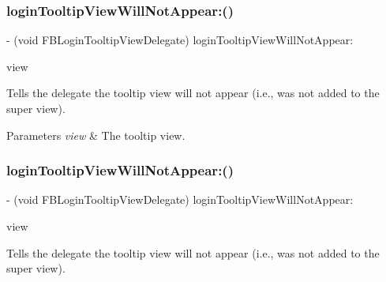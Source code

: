 \subsubsection{\texorpdfstring{login\+Tooltip\+View\+Will\+Not\+Appear\+:()}{loginTooltipViewWillNotAppear:()}\hspace{0.1cm}{\footnotesize\ttfamily [3/5]}}
{\footnotesize\ttfamily -\/ (void F\+B\+Login\+Tooltip\+View\+Delegate) login\+Tooltip\+View\+Will\+Not\+Appear\+: \begin{DoxyParamCaption}\item[{(\hyperlink{interfaceFBLoginTooltipView}{F\+B\+Login\+Tooltip\+View} $\ast$)}]{view }\end{DoxyParamCaption}\hspace{0.3cm}{\ttfamily [optional]}}

Tells the delegate the tooltip view will not appear (i.\+e., was not added to the super view).


\begin{DoxyParams}{Parameters}
{\em view} & The tooltip view. \\
\hline
\end{DoxyParams}
\mbox{\label{protocolFBLoginTooltipViewDelegate_01-p_a90d8a02f0672da781a5b50e517f75685}} 
\subsubsection{\texorpdfstring{login\+Tooltip\+View\+Will\+Not\+Appear\+:()}{loginTooltipViewWillNotAppear:()}\hspace{0.1cm}{\footnotesize\ttfamily [4/5]}}
{\footnotesize\ttfamily -\/ (void F\+B\+Login\+Tooltip\+View\+Delegate) login\+Tooltip\+View\+Will\+Not\+Appear\+: \begin{DoxyParamCaption}\item[{(\hyperlink{interfaceFBLoginTooltipView}{F\+B\+Login\+Tooltip\+View} $\ast$)}]{view }\end{DoxyParamCaption}\hspace{0.3cm}{\ttfamily [optional]}}

Tells the delegate the tooltip view will not appear (i.\+e., was not added to the super view).


